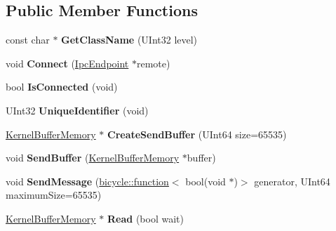 \subsection*{Public Member Functions}
\begin{DoxyCompactItemize}
\item 
\mbox{\label{class_ipc_endpoint_aa54fd29187d9bc631b4189ef6fa7cf61}} 
const char $\ast$ {\bfseries Get\+Class\+Name} (U\+Int32 level)
\item 
\mbox{\label{class_ipc_endpoint_a1182438bf047eaba5824227160469f8a}} 
void {\bfseries Connect} (\hyperlink{class_ipc_endpoint}{Ipc\+Endpoint} $\ast$remote)
\item 
\mbox{\label{class_ipc_endpoint_a5bff070b0d3a8271e0f6d7ae6b3830f6}} 
bool {\bfseries Is\+Connected} (void)
\item 
\mbox{\label{class_ipc_endpoint_a0fcd1bb72527d7c9a89dc8a3afd9aa31}} 
U\+Int32 {\bfseries Unique\+Identifier} (void)
\item 
\mbox{\label{class_ipc_endpoint_a31c1a0eb19a7239bd7fb55e9839f32eb}} 
\hyperlink{class_kernel_buffer_memory}{Kernel\+Buffer\+Memory} $\ast$ {\bfseries Create\+Send\+Buffer} (U\+Int64 size=65535)
\item 
\mbox{\label{class_ipc_endpoint_aa3bc4549fac5a36ae910c1795020e4af}} 
void {\bfseries Send\+Buffer} (\hyperlink{class_kernel_buffer_memory}{Kernel\+Buffer\+Memory} $\ast$buffer)
\item 
\mbox{\label{class_ipc_endpoint_ab985ebe471c4ecf102931af96c47f9e5}} 
void {\bfseries Send\+Message} (\hyperlink{classbicycle_1_1function}{bicycle\+::function}$<$ bool(void $\ast$)$>$ generator, U\+Int64 maximum\+Size=65535)
\item 
\mbox{\label{class_ipc_endpoint_a6cb0e252a71ee86add470ed1455f88f1}} 
\hyperlink{class_kernel_buffer_memory}{Kernel\+Buffer\+Memory} $\ast$ {\bfseries Read} (bool wait)
\end{DoxyCompactItemize}
